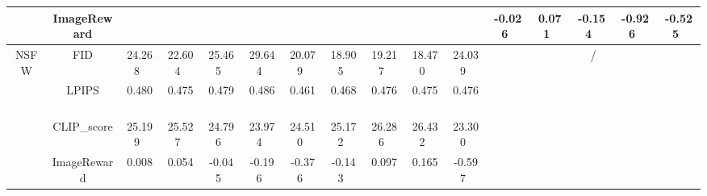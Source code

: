 \begin{table*}
{\begin{tabular}{c|c|c|c|c|c|c|c|c|c|c|c|c|c|c|c}
\cline{2-2}\cline{12-16}
                                                                            & ImageReward     & \multicolumn{9}{c|}{}                                                                                                                                 & -0.026~     & 0.071~       & -0.154~        & -0.926~        & -0.525~        \\ 
\hline
\multirow{4}{*}{NSFW}                                                       & FID             & 24.268~        & 22.604~          & 25.465~          & 29.644~          & 20.079~        & 18.905~        & 19.217~      & 18.470~      & 24.039~     & \multicolumn{5}{c}{\multirow{4}{*}{/}}                                       \\ 
\cline{2-11}
                                                                            & LPIPS           & 0.480~         & 0.475~           & 0.479~           & 0.486~           & 0.461~         & 0.468~         & 0.476~       & 0.475~       & 0.476~      & \multicolumn{5}{c}{}                                                         \\ 
\cline{2-11}
                                                                            & CLIP\_score     & 25.199~        & 25.527~          & 24.796~          & 23.974~          & 24.510~        & 25.172~        & 26.286~      & 26.432~      & 23.300~     & \multicolumn{5}{c}{}                                                         \\ 
\cline{2-11}
                                                                            & ImageReward     & 0.008~         & 0.054~           & -0.045~          & -0.196~          & -0.376~        & -0.143~        & 0.097~       & 0.165~       & -0.597~     & \multicolumn{5}{c}{}                                                         \\
\bottomrule
\end{tabular}
}
\end{table*}